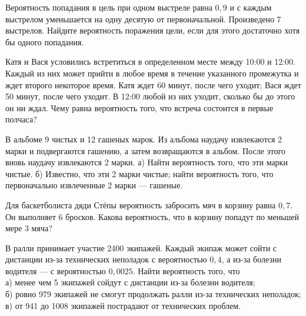 \documentclass[12pt,a4paper,%
]{scrartcl}
\begin{document}
\vfill\newpage\setcounter{zad}{0}






\begin{zkrW}{20}\noindent Вероятность попадания в цель при одном выстреле равна $0{,}9$ и с каждым выстрелом уменьшается на одну десятую от первоначальной. Произведено 7 выстрелов. Найдите вероятность поражения цели, если для этого достаточно хотя бы одного попадания.
 \end{zkrW}

\vfill


\begin{zkrW}{20}\noindent Катя и Вася условились встретиться в определенном месте между 10:00 и 12:00. Каждый из них может прийти в любое время в течение указанного промежутка и ждет второго некоторое время. Катя ждет 60 минут, после чего уходит; Вася ждет 50 минут, после чего уходит. В 12:00 любой из них уходит, сколько бы до этого он ни ждал. Чему равна вероятность того, что встреча состоится в первые полчаса?
 \end{zkrW}

\vfill


\begin{zkrW}{20}\noindent В альбоме 9 чистых и 12 гашеных марок. Из альбома наудачу извлекаются 2 марки и подвергаются гашению, а затем возвращаются в альбом. После этого вновь наудачу извлекаются 2 марки. а) Найти вероятность того, что эти марки чистые. б) Известно, что эти 2 марки чистые; найти вероятность того, что первоначально извлеченные 2 марки --- гашеные.
 \end{zkrW}

\vfill



\begin{zkrW}{20}\noindent Для баскетболиста дяди Стёпы вероятность забросить мяч в корзину равна $0{,}7$. Он выполняет 6 бросков. Какова вероятность, что в корзину попадут по меньшей мере 3 мяча?
 \end{zkrW}

\vfill



\begin{zkrW}{20}\noindent В ралли принимает участие 2400 экипажей. Каждый экипаж может сойти с дистанции из-за технических неполадок с вероятностью $0{,}4$, а из-за болезни водителя --- с вероятностью $0{,}0025$. Найти вероятность того, что \\ \indent а) менее чем 5 экипажей сойдут с дистанции из-за болезни водителя; \\ \indent б) ровно 979 экипажей не смогут продолжать ралли из-за технических неполадок; \\ \indent в) от 941 до 1008 экипажей пострадают от технических проблем.
 \end{zkrW}


\vfill\newpage\setcounter{zad}{0}
\end{document}
